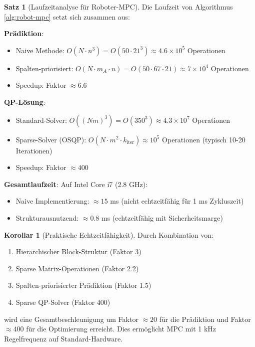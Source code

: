﻿\documentclass[a4paper,12pt]{report}
\theoremstyle{definition}
\newtheorem{satz}{Satz}
\newtheorem{korollar}{Korollar}
\begin{document}
	\begin{satz}[Laufzeitanalyse für Roboter-MPC]
		Die Laufzeit von Algorithmus \ref{alg:robot-mpc} setzt sich zusammen aus:
		
		\textbf{Prädiktion}:
		\begin{itemize}
			\item Naive Methode: $O(N \cdot n^3) = O(50 \cdot 21^3) \approx 4.6 \times 10^5$ Operationen
			\item Spalten-priorisiert: $O(N \cdot m_A \cdot n) = O(50 \cdot 67 \cdot 21) \approx 7 \times 10^4$ Operationen
			\item Speedup: Faktor $\approx 6.6$
		\end{itemize}
		
		\textbf{QP-Lösung}:
		\begin{itemize}
			\item Standard-Solver: $O((Nm)^3) = O(350^3) \approx 4.3 \times 10^7$ Operationen
			\item Sparse-Solver (OSQP): $O(N \cdot m^2 \cdot k_{\text{iter}}) \approx 10^5$ Operationen (typisch 10-20 Iterationen)
			\item Speedup: Faktor $\approx 400$
		\end{itemize}
		
		\textbf{Gesamtlaufzeit}:
		Auf Intel Core i7 (2.8 GHz):
		\begin{itemize}
			\item Naive Implementierung: $\approx 15$ ms (nicht echtzeitfähig für 1 ms Zykluszeit)
			\item Strukturausnutzend: $\approx 0.8$ ms (echtzeitfähig mit Sicherheitsmarge)
		\end{itemize}
	\end{satz}
	
	\begin{korollar}[Praktische Echtzeitfähigkeit]
		Durch Kombination von:
		\begin{enumerate}
			\item Hierarchischer Block-Struktur (Faktor 3)
			\item Sparse Matrix-Operationen (Faktor 2.2)
			\item Spalten-priorisierter Prädiktion (Faktor 1.5)
			\item Sparse QP-Solver (Faktor 400)
		\end{enumerate}
		
		wird eine Gesamtbeschleunigung um Faktor $\approx 20$ für die Prädiktion und Faktor $\approx 400$ für die Optimierung erreicht. Dies ermöglicht MPC mit 1 kHz Regelfrequenz auf Standard-Hardware.
	\end{korollar}
	
\end{document}
